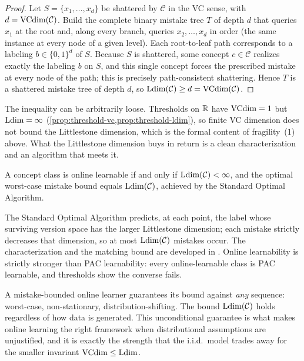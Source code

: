 \begin{proof}
Let $S = \{x_1, \ldots, x_d\}$ be shattered by $\mathcal{C}$ in the VC sense, with $d = \mathrm{VCdim}(\mathcal{C})$. Build the complete binary mistake tree $T$ of depth $d$ that queries $x_1$ at the root and, along every branch, queries $x_2, \ldots, x_d$ in order (the same instance at every node of a given level). Each root-to-leaf path corresponds to a labeling $b \in \{0,1\}^d$ of $S$. Because $S$ is shattered, some concept $c \in \mathcal{C}$ realizes exactly the labeling $b$ on $S$, and this single concept forces the prescribed mistake at every node of the path; this is precisely path-consistent shattering. Hence $T$ is a shattered mistake tree of depth $d$, so $\mathrm{Ldim}(\mathcal{C}) \geq d = \mathrm{VCdim}(\mathcal{C})$.
\end{proof}

The inequality can be arbitrarily loose. Thresholds on $\mathbb{R}$ have $\mathrm{VCdim} = 1$ but $\mathrm{Ldim} = \infty$ (\cref{prop:threshold-vc,prop:threshold-ldim}), so finite VC dimension does not bound the Littlestone dimension, which is the formal content of fragility~(1) above. What the Littlestone dimension buys in return is a clean characterization and an algorithm that meets it.

\begin{thm}
\label{thm:ldim-char}
A concept class is online learnable if and only if $\mathrm{Ldim}(\mathcal{C}) < \infty$, and the optimal worst-case mistake bound equals $\mathrm{Ldim}(\mathcal{C})$, achieved by the Standard Optimal Algorithm.
\end{thm}

The Standard Optimal Algorithm predicts, at each point, the label whose surviving version space has the larger Littlestone dimension; each mistake strictly decreases that dimension, so at most $\mathrm{Ldim}(\mathcal{C})$ mistakes occur. The characterization and the matching bound are developed in . Online learnability is strictly stronger than PAC learnability: every online-learnable class is PAC learnable, and thresholds show the converse fails.

\begin{remark}
\label{rmk:online-robustness}
A mistake-bounded online learner guarantees its bound against \emph{any} sequence: worst-case, non-stationary, distribution-shifting. The bound $\mathrm{Ldim}(\mathcal{C})$ holds regardless of how data is generated. This unconditional guarantee is what makes online learning the right framework when distributional assumptions are unjustified, and it is exactly the strength that the i.i.d.\ model trades away for the smaller invariant $\mathrm{VCdim} \leq \mathrm{Ldim}$.
\end{remark}

